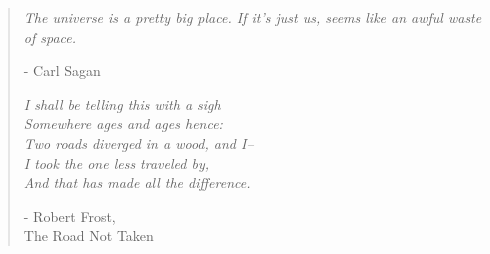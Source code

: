 \vspace{20mm}
\begin{quote}

\textit{The universe is a pretty big place. If it's just us, seems like an awful waste of space.}

\vspace{-7mm}

\begin{flushright}
	- Carl Sagan
\end{flushright}

\textit{I shall be telling this with a sigh \\
Somewhere ages and ages hence: \\
Two roads diverged in a wood, and I-- \\
I took the one less traveled by, \\
And that has made all the difference.
}

\vspace{-7mm}

\begin{flushright}
	- Robert Frost, \\ The Road Not Taken
\end{flushright}


\end{quote}
